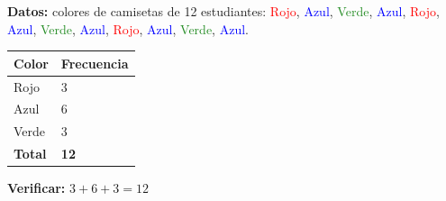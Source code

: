 \documentclass[12pt, letterpaper]{article}
\begin{document}
	\begin{ejemplo}
		\textbf{Datos:} colores de camisetas de 12 estudiantes:
		\textcolor{red}{Rojo}, \textcolor{blue}{Azul}, \textcolor{ForestGreen}{Verde}, \textcolor{blue}{Azul}, \textcolor{red}{Rojo}, \textcolor{blue}{Azul}, \textcolor{ForestGreen}{Verde}, \textcolor{blue}{Azul}, \textcolor{red}{Rojo}, \textcolor{blue}{Azul}, \textcolor{ForestGreen}{Verde}, \textcolor{blue}{Azul}.
		
		\begin{center}
			\renewcommand{\arraystretch}{1.5}
			\begin{tabular}{|m{3cm}|m{2.5cm}|}
				\hline
				\rowcolor{valblue!20}\textbf{Color} & \textbf{Frecuencia} \\
				\hline
				Rojo  & 3 \\
				\hline
				Azul  & 6 \\
				\hline
				Verde & 3 \\
				\hline
				\rowcolor{valblue!10}\textbf{Total} & \textbf{12} \\
				\hline
			\end{tabular}
		\end{center}
		
		\textbf{Verificar:} $3+6+3=12$ \checkmark
	\end{ejemplo}
	\newpage
\end{document}
